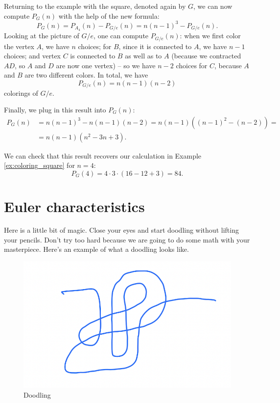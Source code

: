 \begin{example}
Returning to the example with the square, denoted again by $G$, we can now compute $P_G(n)$ with the help of the new formula:
$$ P_G(n) = P_{A_4}(n) - P_{G/e}(n) = n(n-1)^3 - P_{G/e}(n)
.$$
Looking at the picture of $G/e$, one can compute $P_{G/e}(n)$: when we first color the vertex $A$, we have $n$ choices; for $B$, since it is connected to $A$, we have $n-1$ choices; and vertex $C$ is connected to $B$ as well as to $A$ (because we contracted $AD$, so $A$ and $D$ are now one vertex) -- so we have $n-2$ choices for $C$, because $A$ and $B$ are two different colors. In total, we have
$$P_{G/e}(n) = n(n-1)(n-2)
$$
colorings of $G/e$.

Finally, we plug in this result into $P_G(n)$:
\begin{equation*}
\begin{split}
    P_G(n) &= n(n-1)^3 - n(n-1)(n-2) = 
n(n-1) \left( (n-1)^2 - (n-2) \right) = \\
    &= n(n-1)(n^2 - 3n +3)
.
\end{split}    
\end{equation*}

We can check that this result recovers our calculation in Example \ref{ex:coloring_square} for $n=4$:
$$ P_G(4) = 4 \cdot 3 \cdot (16 - 12 + 3) = 84
.$$
    
\end{example}




\section{Euler characteristics}

Here is a little bit of magic. 
Close your eyes and start doodling without lifting your pencils.
Don't try too hard because we are going to do some math with your masterpiece.
Here's an example of what a doodling looks like.

\begin{figure}[htpb]
    \centering
    \includegraphics[width=0.4\linewidth]{Figures/doodle1}
    \caption{Doodling}%
    \label{fig:doodle1}
\end{figure}

